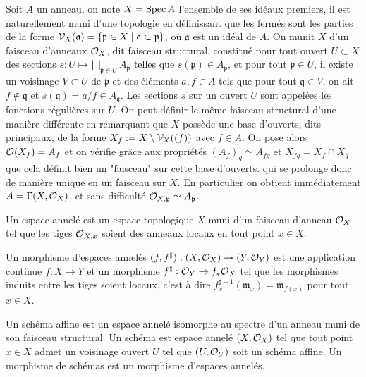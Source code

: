 Soit $A$ un anneau, on note $X=\operatorname{Spec} A$ l'ensemble de ses idéaux premiers, il est naturellement muni d'une topologie en définissant que les fermés sont les parties de la forme $\mathcal{V}_X(\mathfrak{a})=\lbrace \mathfrak{p}\in X\mid \mathfrak{a}\subset \mathfrak{p}\rbrace$, où $\mathfrak{a}$ est un idéal de $A$. On munit $X$ d'un faisceau d'anneaux $\mathcal{O}_X$, dit faisceau structural, constitué pour tout ouvert $U\subset X$ des sections $s: U\mapsto \bigsqcup_{\mathfrak{p}\in U}A_\mathfrak{p}$ telles que $s(\mathfrak{p})\in A_\mathfrak{p}$, et pour tout $\mathfrak{p}\in U$, il existe un voisinage $V\subset U$ de $\mathfrak{p}$ et des éléments $a,f\in A$ tels que pour tout $\mathfrak{q}\in V$, on ait $f\notin \mathfrak{q}$ et $s(\mathfrak{q})=a/f\in A_\mathfrak{q}$. Les sections $s$ sur un ouvert $U$ sont appelées les fonctions régulières sur $U$. On peut définir le même faisceau structural d'une manière différente en remarquant que $X$ possède une base d'ouverts, dits principaux, de la forme $X_f:=X\setminus \mathcal{V}_X((f))$ avec $f\in A$. On pose alors $\mathcal{O}(X_f)=A_f$ et on vérifie grâce aux propriétés $(A_f)_g\simeq A_{fg}$ et $X_{fg}=X_f\cap X_g$ que cela définit bien un "faisceau" sur cette base d'ouverts. qui se prolonge donc de manière unique en un faisceau sur $X$. En particulier on obtient immédiatement $A=\Gamma(X, \mathcal{O}_X)$, et sans difficulté $\mathcal{O}_{X,\mathfrak{p}}\simeq A_\mathfrak{p}$. 

\begin{defn}
Un espace annelé est un espace topologique $X$ muni d'un faisceau d'anneau $\mathcal{O}_X$ tel que les tiges $\mathcal{O}_{X,x}$ soient des anneaux locaux en tout point $x\in X$.

Un morphisme d'espaces annelés $(f, f^\sharp):(X,\mathcal{O}_X)\rightarrow (Y,\mathcal{O}_Y)$ est une application continue $f:X\rightarrow Y$ et un morphisme $f^\sharp:\mathcal{O}_Y\rightarrow f_*\mathcal{O}_X$ tel que les morphismes induits entre les tiges soient locaux, c'est à dire $f^{\sharp -1}_x(\mathfrak{m}_x)=\mathfrak{m}_{f(x)}$ pour tout $x\in X$.
\end{defn}

\begin{defn}
Un schéma affine est un espace annelé isomorphe au spectre d'un anneau muni de son faisceau structural. Un schéma est espace annelé $(X,\mathcal{O}_X)$ tel que tout point $x\in X$ admet un voisinage ouvert $U$ tel que $(U,\mathcal{O}_U)$ soit un schéma affine. Un morphisme de schémas est un morphisme d'espaces annelés.
\end{defn}

